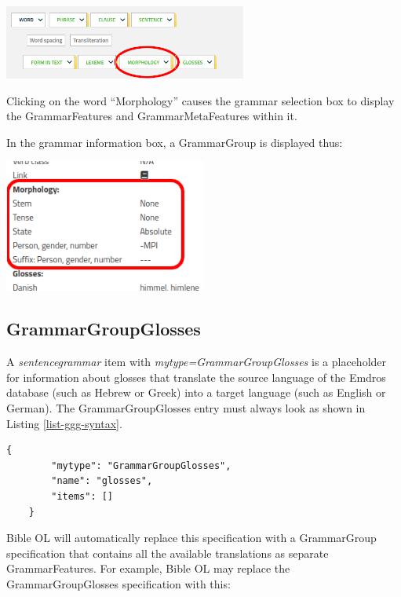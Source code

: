 \documentclass[11pt,oneside,a4paper]{memoir}
\begin{document}
\begin{center}
  \includegraphics[width=0.6\textwidth]{morph1.png}
\end{center}

Clicking on the word ``Morphology'' causes the grammar selection box to display the Grammar\-Features
and GrammarMetaFeatures within it.

\Needspace*{5cm}%
In the grammar information box, a GrammarGroup is displayed thus:

\begin{center}
  \includegraphics[width=0.5\textwidth]{morph2.png}
\end{center}


\subsection{GrammarGroupGlosses}\label{sec-grammargroupglosses}
 
A \emph{sentencegrammar} item with \emph{mytype=GrammarGroupGlosses} is a placeholder for
information about glosses that translate the source language of the Emdros database (such as Hebrew
or Greek) into a target language (such as English or German). The GrammarGroupGlosses entry must
always look as shown in Listing \ref{list-ggg-syntax}.
 
\begin{lstlisting}[caption=GrammarGroupGlosses syntax,label=list-ggg-syntax]
    {
        "mytype": "GrammarGroupGlosses",
        "name": "glosses",
        "items": []
    }
\end{lstlisting}
 
Bible OL will automatically replace this specification with a GrammarGroup specification that
contains all the available translations as separate GrammarFeatures. For example, Bible OL may
replace the GrammarGroupGlosses specification with this:
 
\end{document}
